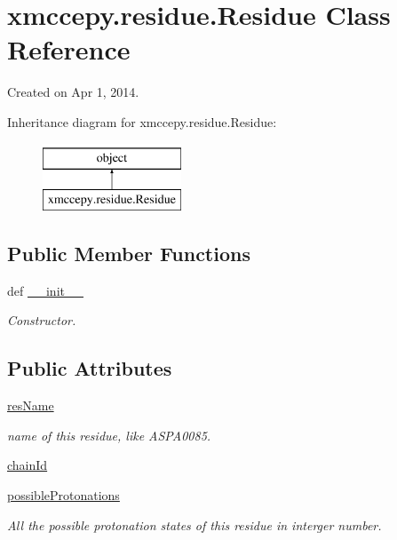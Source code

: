 \hypertarget{classxmccepy_1_1residue_1_1_residue}{\section{xmccepy.\-residue.\-Residue Class Reference}
\label{classxmccepy_1_1residue_1_1_residue}
}


Created on Apr 1, 2014.  


Inheritance diagram for xmccepy.\-residue.\-Residue\-:\begin{figure}[H]
\begin{center}
\leavevmode
\includegraphics[height=2.000000cm]{classxmccepy_1_1residue_1_1_residue}
\end{center}
\end{figure}
\subsection*{Public Member Functions}
\begin{DoxyCompactItemize}
\item 
def \hyperlink{classxmccepy_1_1residue_1_1_residue_ab61144d8c5aed99cc706225b17e9ac03}{\-\_\-\-\_\-init\-\_\-\-\_\-}
\begin{DoxyCompactList}\small\item\em Constructor. \end{DoxyCompactList}\end{DoxyCompactItemize}
\subsection*{Public Attributes}
\begin{DoxyCompactItemize}
\item 
\hyperlink{classxmccepy_1_1residue_1_1_residue_a07eb4b463b514b1f1e86d03a6ff02a98}{res\-Name}
\begin{DoxyCompactList}\small\item\em name of this residue, like A\-S\-P\-A0085. \end{DoxyCompactList}\item 
\hyperlink{classxmccepy_1_1residue_1_1_residue_afdd072f15f2fa5640bd67e0e5f6eb1de}{chain\-Id}
\item 
\hyperlink{classxmccepy_1_1residue_1_1_residue_a11fc883a79c0221399f7a36fee4a6f9a}{possible\-Protonations}
\begin{DoxyCompactList}\small\item\em All the possible protonation states of this residue in interger number. \end{DoxyCompactList}\end{DoxyCompactItemize}


